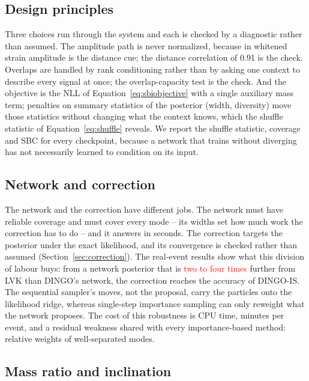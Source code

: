 \documentclass[twocolumn,linenumbers]{aastex701}
\newcommand{\pending}[1]{\textcolor{red}{#1}}
\begin{document}
\subsection{Design principles}

Three choices run through the system and each is checked by a diagnostic
rather than assumed. The amplitude path is never normalized, because in
whitened strain amplitude is the distance cue; the distance correlation of
0.91 is the check. Overlaps are handled by rank conditioning rather than by
asking one context to describe every signal at once; the overlap-capacity test
is the check. And the objective is the NLL of Equation~\ref{eq:sbiobjective}
with a single auxiliary mass term; penalties on summary statistics of the
posterior (width, diversity) move those statistics without changing what the
context knows, which the shuffle statistic of Equation~\ref{eq:shuffle}
reveals. We report the shuffle statistic, coverage and SBC for every
checkpoint, because a network that trains without diverging has not
necessarily learned to condition on its input.

\subsection{Network and correction}

The network and the correction have different jobs. The network must have
reliable coverage and must cover every mode -- its widths set how much work the
correction has to do -- and it answers in seconds. The correction targets the
posterior under the exact likelihood, and its convergence is checked rather
than assumed (Section~\ref{sec:correction}). The real-event results show what
this division of labour buys: from a network posterior that is \pending{two to four
times} further from LVK than DINGO's network, the correction reaches the
accuracy of DINGO-IS. The sequential sampler's moves, not the proposal, carry
the particles onto the likelihood ridge, whereas single-step importance
sampling can only reweight what the network proposes. The cost of this
robustness is CPU time, minutes per event, and a residual weakness shared with
every importance-based method: relative weights of well-separated modes.

\subsection{Mass ratio and inclination}
\end{document}
